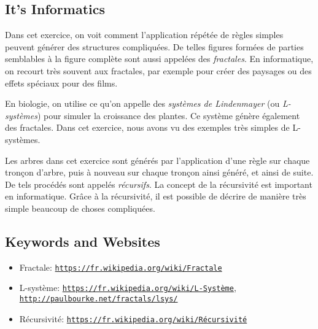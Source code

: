 \documentclass[a4paper,11pt]{report}
\newcommand{\BrochureUrlText}[1]{\texttt{#1}}
\begin{document}
\subsection*{It’s Informatics}

Dans cet exercice, on voit comment l’application répétée de règles simples peuvent générer des structures compliquées. De telles figures formées de parties semblables à la figure complète sont aussi appelées des \emph{fractales}. En informatique, on recourt très souvent aux fractales, par exemple pour créer des paysages ou des effets spéciaux pour des films.

En biologie, on utilise ce qu’on appelle des \emph{systèmes de Lindenmayer} (ou \emph{L-systèmes}) pour simuler la croissance des plantes. Ce système génère également des fractales. Dans cet exercice, nous avons vu des exemples très simples de L-systèmes.

Les arbres dans cet exercice sont générés par l’application d’une règle sur chaque tronçon d’arbre, puis à nouveau sur chaque tronçon ainsi généré, et ainsi de suite. De tels procédés sont appelés \emph{récursifs}. La concept de la récursivité est important en informatique. Grâce à la récursivité, il est possible de décrire de manière très simple beaucoup de choses compliquées.

{\raggedright

\subsection*{Keywords and Websites}

\begin{itemize}
  \item Fractale: \href{https://fr.wikipedia.org/wiki/Fractale}{\BrochureUrlText{https://fr.wikipedia.org/wiki/Fractale}}
  \item L-système: \href{https://fr.wikipedia.org/wiki/L-Syst\%C3\%A8me}{\BrochureUrlText{https://fr.wikipedia.org/wiki/L-Système}}, \href{http://paulbourke.net/fractals/lsys/}{\BrochureUrlText{http://paulbourke.net/fractals/lsys/}}
  \item Récursivité: \href{https://fr.wikipedia.org/wiki/R\%C3\%A9cursivit\%C3\%A9}{\BrochureUrlText{https://fr.wikipedia.org/wiki/Récursivité}}
\end{itemize}


}
\end{document}
